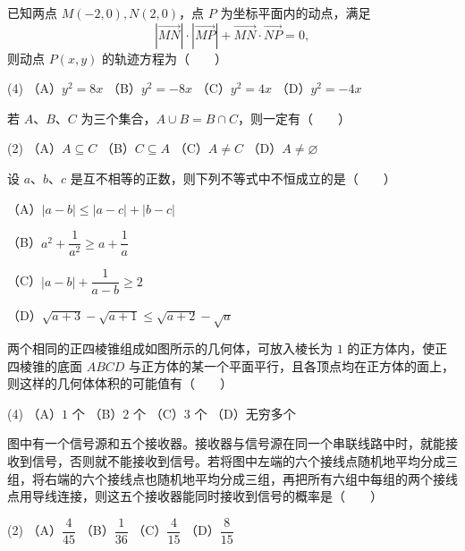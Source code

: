 \begin{question}
已知两点 $M(-2,0),N(2,0)$，点 $P$ 为坐标平面内的动点，满足
\nopagebreak[4]
\[\left|\overrightarrow{MN}\right|\cdot\left|\overrightarrow{MP}\right|+\overrightarrow{MN}\cdot\overrightarrow{NP}=0,\]
则动点 $P(x,y)$ 的轨迹方程为\mbox{（　　）}

\begin{gkopts}(4)
\task （A）$y^2=8x$
\task （B）$y^2=-8x$
\task （C）$y^2=4x$
\task （D）$y^2=-4x$
\end{gkopts}

\end{question}
\begin{question}
若 $A\text{、}B\text{、}C$ 为三个集合，$A\cup B=B\cap C$，则一定有\mbox{（　　）}

\begin{gkopts}(2)
\task （A）$A\subseteq C$
\task （B）$C\subseteq A$
\task （C）$A\ne C$
\task （D）$A\ne\varnothing$
\end{gkopts}

\end{question}
\begin{question}
设 $a\text{、}b\text{、}c$ 是互不相等的正数，则下列不等式中不恒成立的是\mbox{（　　）}

（A）$|a-b|\leqslant|a-c|+|b-c|$

（B）$a^2+\dfrac{1}{a^2}\geqslant a+\dfrac{1}{a}$

（C）$|a-b|+\dfrac{1}{a-b}\geqslant2$

（D）$\sqrt{a+3}-\sqrt{a+1}\leqslant\sqrt{a+2}-\sqrt a$

\Needspace{0.4\textheight}
\end{question}
\begin{question}
两个相同的正四棱锥组成如图所示的几何体，可放入棱长为 $1$ 的正方体内，使正四棱锥的底面 $ABCD$ 与正方体的某一个平面平行，且各顶点均在正方体的面上，则这样的几何体体积的可能值有\mbox{（　　）}

\begin{gkopts}(4)
\task （A）$1$ 个
\task （B）$2$ 个
\task （C）$3$ 个
\task （D）无穷多个
\end{gkopts}
\nopagebreak[4]
\begin{center}\end{center}
\nopagebreak[4]
\Needspace{0.4\textheight}
\end{question}
\begin{question}
图中有一个信号源和五个接收器。接收器与信号源在同一个串联线路中时，就能接收到信号，否则就不能接收到信号。若将图中左端的六个接线点随机地平均分成三组，将右端的六个接线点也随机地平均分成三组，再把所有六组中每组的两个接线点用导线连接，则这五个接收器能同时接收到信号的概率是\mbox{（　　）}

\begin{gkopts}(2)
\task （A）$\dfrac{4}{45}$
\task （B）$\dfrac{1}{36}$
\task （C）$\dfrac{4}{15}$
\task （D）$\dfrac{8}{15}$
\end{gkopts}
\nopagebreak[4]
\begin{center}\end{center}
\nopagebreak[4]
\end{question}
